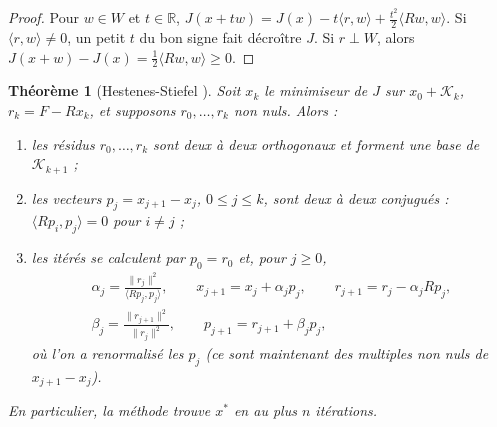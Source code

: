\documentclass[11pt,a4paper]{article}
\theoremstyle{plain}
\newtheorem{theoreme}{Théorème}[section]
\theoremstyle{definition}
\theoremstyle{remark}
\newcommand{\R}{\mathbb{R}}
\newcommand{\K}{\mathcal{K}}
\newcommand{\ps}[2]{\langle #1,#2\rangle}
\begin{document}
\begin{proof}
Pour $w\in W$ et $t\in\R$, $J(x+tw)=J(x)-t\ps{r}{w}+\frac{t^2}2\ps{Rw}{w}$. Si $\ps{r}{w}\neq0$, un petit $t$ du bon signe fait décroître $J$. Si $r\perp W$, alors $J(x+w)-J(x)=\frac12\ps{Rw}{w}\geq0$.
\end{proof}

\begin{theoreme}[Hestenes-Stiefel \cite{hs}]\label{thm:gc}
Soit $x_k$ le minimiseur de $J$ sur $x_0+\K_k$, $r_k=F-Rx_k$, et supposons $r_0,\dots,r_{k}$ non nuls. Alors :
\begin{enumerate}[nosep]
\item les résidus $r_0,\dots,r_k$ sont deux à deux orthogonaux et forment une base de $\K_{k+1}$ ;
\item les vecteurs $p_j=x_{j+1}-x_j$, $0\leq j\leq k$, sont deux à deux conjugués : $\ps{Rp_i}{p_j}=0$ pour $i\neq j$ ;
\item les itérés se calculent par $p_0=r_0$ et, pour $j\geq0$,
\[
  \begin{gathered}
  \alpha_j=\frac{\|r_j\|^2}{\ps{Rp_j}{p_j}},\qquad x_{j+1}=x_j+\alpha_jp_j,\qquad r_{j+1}=r_j-\alpha_jRp_j,\\
  \beta_j=\frac{\|r_{j+1}\|^2}{\|r_j\|^2},\qquad p_{j+1}=r_{j+1}+\beta_jp_j,
  \end{gathered}
\]
où l'on a renormalisé les $p_j$ (ce sont maintenant des multiples non nuls de $x_{j+1}-x_j$).
\end{enumerate}
En particulier, la méthode trouve $x^*$ en au plus $n$ itérations.
\end{theoreme}
\end{document}
